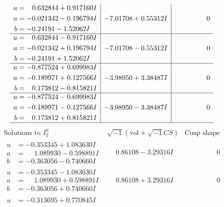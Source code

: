 \documentclass[1p]{elsarticle_modified}
\theoremstyle{definition}
\newcommand{\I}{\sqrt{-1}}
\begin{document}
$$\begin{array}{c|c|c}
\begin{aligned}
u &= \phantom{-}0.632844 + 0.917160 I \\
a &= -0.021342 - 0.196794 I \\
b &= -0.24191 - 1.52062 I\end{aligned}
 & -7.01708 + 0.55312 I & \phantom{-0.000000 } 0 \\ \hline\begin{aligned}
u &= \phantom{-}0.632844 - 0.917160 I \\
a &= -0.021342 + 0.196794 I \\
b &= -0.24191 + 1.52062 I\end{aligned}
 & -7.01708 - 0.55312 I & \phantom{-0.000000 } 0 \\ \hline\begin{aligned}
u &= -0.877524 + 0.699983 I \\
a &= -0.189971 + 0.127566 I \\
b &= \phantom{-}0.173812 - 0.815821 I\end{aligned}
 & -3.98950 + 3.38487 I & \phantom{-0.000000 } 0 \\ \hline\begin{aligned}
u &= -0.877524 - 0.699983 I \\
a &= -0.189971 - 0.127566 I \\
b &= \phantom{-}0.173812 + 0.815821 I\end{aligned}
 & -3.98950 - 3.38487 I & \phantom{-0.000000 } 0\\
 \hline 
 \end{array}$$\newpage$$\begin{array}{c|c|c}  
\text{Solutions to }I^u_{2}& \I (\text{vol} + \sqrt{-1}CS) & \text{Cusp shape}\\
 \hline 
\begin{aligned}
u &= -0.353345 + 1.083630 I \\
a &= \phantom{-}1.089930 - 0.598891 I \\
b &= -0.363056 - 0.740660 I\end{aligned}
 & \phantom{-}0.86108 - 3.29316 I & \phantom{-0.000000 } 0 \\ \hline\begin{aligned}
u &= -0.353345 - 1.083630 I \\
a &= \phantom{-}1.089930 + 0.598891 I \\
b &= -0.363056 + 0.740660 I\end{aligned}
 & \phantom{-}0.86108 + 3.29316 I & \phantom{-0.000000 } 0 \\ \hline\begin{aligned}
u &= -0.313695 + 0.770845 I \\

\end{aligned}
\end{array}$$
\end{document}
